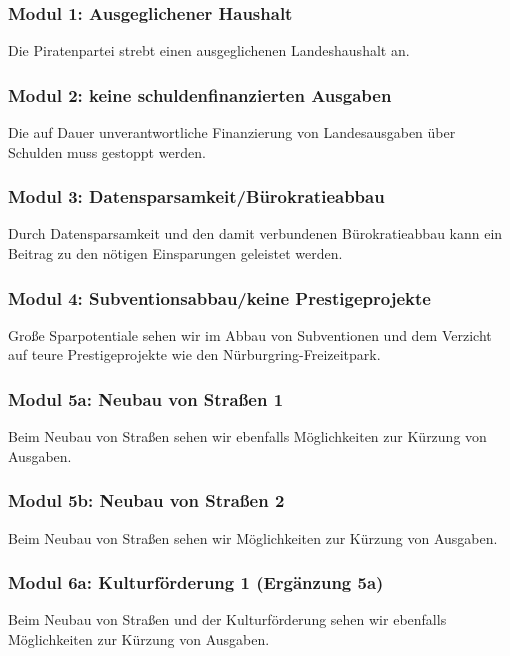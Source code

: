 
\subsubsection{Modul 1: Ausgeglichener Haushalt}
\abstimmung
Die Piratenpartei strebt einen ausgeglichenen Landeshaushalt an.

\subsubsection{Modul 2: keine schuldenfinanzierten Ausgaben}
Die auf Dauer unverantwortliche Finanzierung von Landesausgaben über Schulden muss gestoppt werden.

\subsubsection{Modul 3: Datensparsamkeit/Bürokratieabbau}
\abstimmung
Durch Datensparsamkeit und den damit verbundenen Bürokratieabbau kann ein Beitrag zu den nötigen Einsparungen geleistet werden.

\subsubsection{Modul 4: Subventionsabbau/keine Prestigeprojekte}
\abstimmung
Große Sparpotentiale sehen wir im Abbau von Subventionen und dem Verzicht auf teure Prestigeprojekte wie den Nürburgring-Freizeitpark.

\subsubsection{Modul 5a: Neubau von Straßen 1} 
\abstimmung
Beim Neubau von Straßen sehen wir ebenfalls Möglichkeiten zur Kürzung von Ausgaben.

\subsubsection{Modul 5b: Neubau von Straßen 2}
\abstimmung
Beim Neubau von Straßen sehen wir Möglichkeiten zur Kürzung von Ausgaben.

\subsubsection{Modul 6a: Kulturförderung 1 (Ergänzung 5a)}
\abstimmung
Beim Neubau von Straßen und der Kulturförderung sehen wir ebenfalls Möglichkeiten zur Kürzung von Ausgaben.


